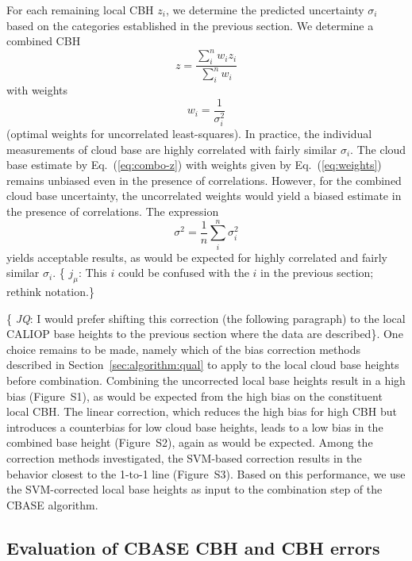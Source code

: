 \documentclass[essd,manuscript]{copernicus}\usepackage[]{graphicx}\usepackage[]{color}
\newcommand{\hlnum}[1]{\textcolor[rgb]{0.686,0.059,0.569}{#1}}%
\newcommand\comment[2]{\{\hlnum{ \textit{#1}: #2}\}}
\newcommand\commentjm[1]{\comment{$j_\mu$}{#1}}
\begin{document}
For each remaining local CBH $z_i$, we determine the predicted
uncertainty $\sigma_i$ based on the categories established in the previous
section.  We determine a combined CBH
\begin{equation}
  \label{eq:combo-z}
  z = \frac{\sum\limits_i^n w_i z_i}{\sum\limits_i^n w_i}
\end{equation}
with weights
\begin{equation}
  \label{eq:weights}
  w_i = \frac 1 {\sigma_i^2}
\end{equation}
(optimal weights for uncorrelated least-squares).  In practice, the individual
measurements of cloud base are highly correlated with fairly similar
$\sigma_i$.  The cloud base estimate by Eq.~(\ref{eq:combo-z}) with weights
given by Eq.~(\ref{eq:weights}) remains unbiased even in the presence of
correlations.  However, for the combined cloud base uncertainty,
the uncorrelated weights would yield a biased estimate in the presence of
correlations.  The expression
\begin{equation}
  \label{eq:combo-sigma}
  \sigma^2 = \frac 1 n \sum\limits_i^n \sigma_i^2
\end{equation}
yields acceptable results, as would be expected for highly correlated and fairly
similar $\sigma_i$.  \commentjm{This $i$ could be confused with the $i$ in the
  previous section; rethink notation.}

\comment{JQ}{I would prefer shifting this correction (the following paragraph) to the local CALIOP base heights
to the previous section where the data are described}. One choice remains to be made, namely which of the bias correction methods
described in Section~\ref{sec:algorithm:qual} to apply to the local cloud base
heights before combination.  Combining the uncorrected local base heights result
in a high bias (Figure~S1), as would be expected from the high bias on the
constituent local CBH.  The linear correction, which reduces the
high bias for high CBH but introduces a counterbias for low cloud
base heights, leads to a low bias in the combined base height (Figure~S2), again
as would be expected.  Among the correction methods investigated, the SVM-based
correction results in the behavior closest to the 1-to-1 line (Figure~S3).
Based on this performance, we use the SVM-corrected local base heights as input
to the combination step of the CBASE algorithm.

\subsection{Evaluation of CBASE CBH and CBH errors}
\label{sec:algorithm:eval}
\end{document}
